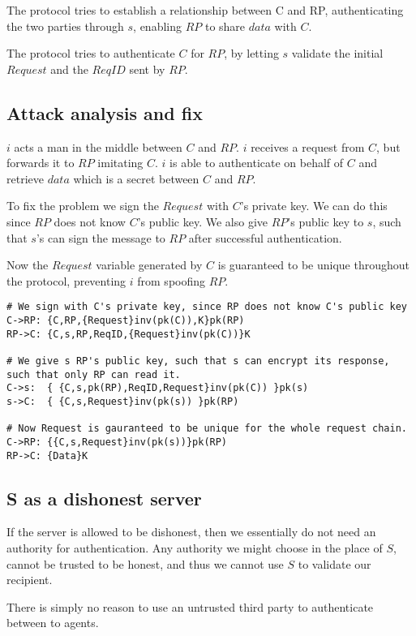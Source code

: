 \documentclass[12pt]{article}
\begin{document}
The protocol tries to establish a relationship between C and RP, authenticating the two parties through $s$, enabling $RP$ to share $data$ with $C$.

The protocol tries to authenticate $C$ for $RP$, by letting $s$ validate the initial $Request$ and the $ReqID$ sent by $RP$.

\subsection{Attack analysis and fix}
\label{sub:Attack analysis and fix}

$i$ acts a man in the middle between $C$ and $RP$. $i$ receives a request from $C$, but forwards it to $RP$ imitating $C$. $i$ is able to authenticate on behalf of $C$ and retrieve $data$ which is a secret between $C$ and $RP$.

To fix the problem we sign the $Request$ with $C$'s private key. We can do this since $RP$ does not know $C$'s public key.
We also give $RP$'s public key to $s$, such that $s$'s can sign the message to $RP$ after successful authentication.

Now the $Request$ variable generated by $C$ is guaranteed to be unique throughout the protocol, preventing $i$ from spoofing $RP$.\\

\begin{lstlisting}
# We sign with C's private key, since RP does not know C's public key
C->RP: {C,RP,{Request}inv(pk(C)),K}pk(RP)
RP->C: {C,s,RP,ReqID,{Request}inv(pk(C))}K

# We give s RP's public key, such that s can encrypt its response, such that only RP can read it.
C->s:  { {C,s,pk(RP),ReqID,Request}inv(pk(C)) }pk(s)
s->C:  { {C,s,Request}inv(pk(s)) }pk(RP)

# Now Request is gauranteed to be unique for the whole request chain.
C->RP: {{C,s,Request}inv(pk(s))}pk(RP)
RP->C: {Data}K
\end{lstlisting}

\subsection{S as a dishonest server}
\label{sub:S as a dishonest server}

If the server is allowed to be dishonest, then we essentially do not need an authority for authentication. Any authority we might choose in the place of $S$, cannot be trusted to be honest, and thus we cannot use $S$ to validate our recipient.

There is simply no reason to use an untrusted third party to authenticate between to agents.
\end{document}
